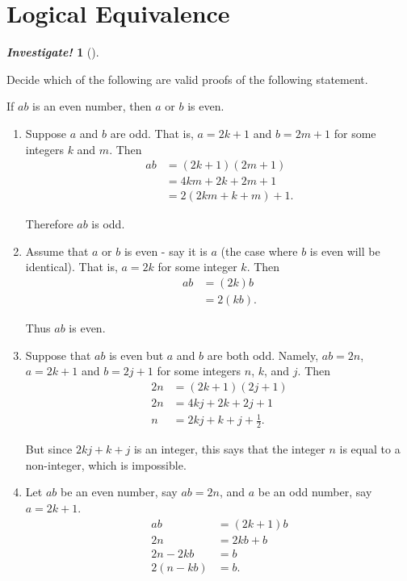 \documentclass[10pt,]{book}
\theoremstyle{plain}
\theoremstyle{definition}
\theoremstyle{definition}
\newtheorem{investigation}[project]{\emph{Investigate!}}
\theoremstyle{definition}
\numberwithin{equation}{chapter}
\newcommand{\amp}{ & }
\begin{document}
\section[Logical Equivalence]{Logical Equivalence}\label{sec_logical-equiv}
\begin{investigation}[]\label{investigation-26}

      Decide which of the following are valid proofs of the following statement.
\par

      If \(a b\) is an even number, then \(a\) or \(b\) is even.
\par

      \leavevmode%
\begin{enumerate}
\item\hypertarget{li-1055}{}
            Suppose \(a\) and \(b\) are odd. That is, \(a=2k+1\) and \(b=2m+1\) for some integers \(k\) and \(m\). Then
            \begin{align*}
 ab \amp =(2k+1)(2m+1)\\
 \amp =4km+2k+2m+1\\
 \amp =2(2km+k+m)+1.
\end{align*}
\par

            Therefore \(ab\) is odd.
\item\hypertarget{li-1056}{}
            Assume that \(a\) or \(b\) is even - say it is \(a\) (the case where \(b\) is even will be identical). That is, \(a=2k\) for some integer \(k\). Then
            \begin{align*}
 ab \amp =(2k)b\\
 \amp =2(kb).
\end{align*}
\par

            Thus \(ab\) is even.
\item\hypertarget{li-1057}{}
            Suppose that \(ab\) is even but \(a\) and \(b\) are both odd. Namely, \(ab = 2n\), \(a=2k+1\) and \(b=2j+1\) for some integers \(n\), \(k\), and \(j\). Then
            \begin{align*}
 2n \amp =(2k+1)(2j+1)\\
 2n \amp =4kj+2k+2j+1\\
 n \amp = 2kj+k+j+\frac{1}{2}.
\end{align*}
\par

            But since \(2kj+k+j\) is an integer, this says that the integer \(n\) is equal to a non-integer, which is impossible.
\item\hypertarget{li-1058}{}
            Let \(ab\) be an even number, say \(ab=2n\), and \(a\) be an odd number, say \(a=2k+1\).
            \begin{align*}
 ab \amp =(2k+1)b\\
 2n \amp =2kb+b\\
 2n-2kb\amp =b\\
 2(n-kb)\amp =b.
\end{align*}
\par


\end{enumerate}
\end{investigation}
\end{document}

